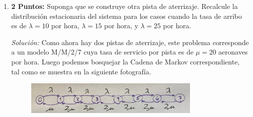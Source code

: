 \documentclass[ a4paper, twoside, 11pt]{article}
\begin{document}
\begin{problem}
\begin{enumerate}[label=\textbf{\alph*)}]
\item \textbf{2 Puntos:} Suponga que se construye otra pista de aterrizaje. Recalcule la distribuci\'on estacionaria del sistema para los casos cuando la tasa de arribo es de $\lambda = 10$ por hora, $\lambda = 15$ por hora, y $\lambda = 25$ por hora. 

\emph{Soluci\'on:} Como ahora hay dos pistas de aterrizaje, este problema corresponde a un modelo M/M/2/7 cuya tasa de servicio por pista es de $\mu = 20$ aeronaves por hora. Luego podemos bosquejar la Cadena de Markov correspondiente, tal como se muestra en la siguiente fotograf\'ia. 

\begin{figure}[htb]
\centering
\includegraphics[width=0.8\textwidth]{problema-1-B.jpg}
\end{figure}


\end{enumerate}
\end{problem}
\end{document}
